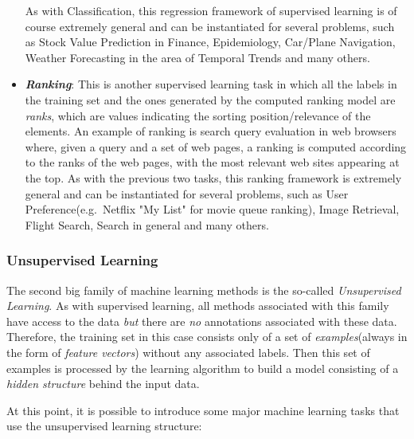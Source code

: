 \begin{itemize}
            As with Classification, this regression framework of
            supervised learning is of course extremely general
            and can be instantiated for several problems, such as
            Stock Value Prediction in Finance, Epidemiology, Car/Plane
            Navigation, Weather Forecasting in the area of Temporal
            Trends and many others.

      \item \emph{\textbf{Ranking}}: This is another supervised learning
            task in which all the labels in the training set and the ones
            generated by the computed ranking model are \emph{ranks},
            which are values indicating the sorting position/relevance
            of the elements. An example of ranking is search query
            evaluation in web browsers where, given a query and a set of
            web pages, a ranking is computed according to the ranks of
            the web pages, with the most relevant web sites appearing at
            the top. As with the previous two tasks, this ranking
            framework is extremely general and can be instantiated for
            several problems, such as User Preference(e.g.\ Netflix
            "My List" for movie queue ranking), Image Retrieval, Flight
            Search, Search in general and many others.
\end{itemize}

\newpage

\subsubsection{Unsupervised Learning}

The second big family of machine learning methods is the so-called
\emph{Unsupervised Learning}. As with supervised learning,
all methods associated with this family have access to the data
\emph{but} there are \emph{no} annotations associated with these data.
Therefore, the training set in this case consists only of a set
of \emph{examples}(always in the form of \emph{feature vectors})
without any associated labels. Then this set of examples is processed
by the learning algorithm to build a model consisting of a
\emph{hidden structure} behind the input data.

At this point, it is possible to introduce some major machine learning
tasks that use the unsupervised learning structure:

